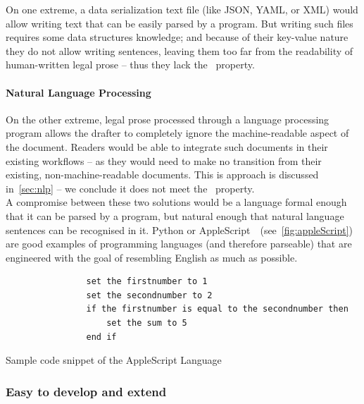 On one extreme, a data serialization text file (like JSON, YAML, or XML) would allow writing text that can be easily parsed by a program.
But writing such files requires some data structures knowledge;
and because of their key-value nature they do not allow writing sentences, leaving them too far from the readability of human-written legal prose -- thus they lack the~ property.

\paragraph{Natural Language Processing}

On the other extreme, legal prose processed through a language processing program allows the drafter to completely ignore the machine-readable aspect of the document.
Readers would be able to integrate such documents in their existing workflows -- as they would need to make no transition from their existing, non-machine-readable documents.
This is approach is discussed in~\autoref{sec:nlp} -- we conclude it does not meet the~ property.  \\

A compromise between these two solutions would be a language formal enough that it can be parsed by a program, but natural enough that natural language sentences can be recognised in it.
Python or AppleScript~\cite{Sanderson2010appleScript}~(see~\autoref{fig:appleScript}) are good examples of programming languages (and therefore parseable) that are engineered with the goal of resembling English as much as possible.

\begin{listing}[h]
    \centering
    \begin{minipage}{0.8\textwidth}
        \begin{verbatim}
                set the firstnumber to 1
                set the secondnumber to 2
                if the firstnumber is equal to the secondnumber then
                    set the sum to 5
                end if
        \end{verbatim}
    \end{minipage}
    \caption{Sample code snippet of the AppleScript Language~\cite{Sanderson2010appleScript}}
    \label{fig:appleScript}
\end{listing}

\subsubsection{Easy to develop and extend}

